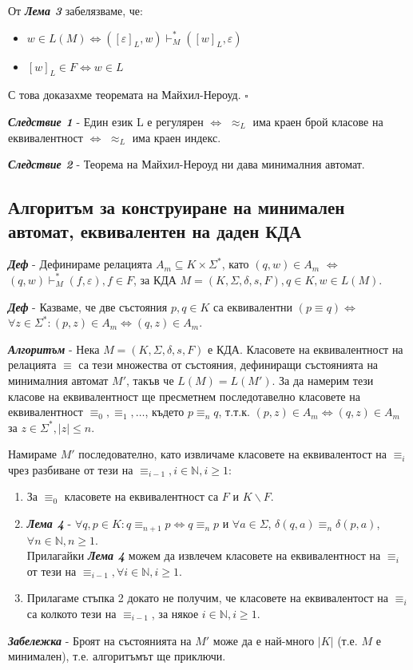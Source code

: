 \documentclass[fleqn,12pt]{article}
\begin{document}
\begin{flushleft}
От \textit{\textbf{Лема 3}} забелязваме, че:
\begin{itemize}
    \item $w \in L(M) \iff ([\varepsilon]_L, w) \vdash_M^* ([w]_L, \varepsilon)$
    \item $[w]_L \in F \iff w \in L$
\end{itemize}

С това доказахме теоремата на Майхил-Нероуд. $\square$

\textit{\textbf{Следствие 1}} - Един език L е регулярен $\iff$ $\approx_L$ има краен брой класове на еквивалентност $\iff$ $\approx_L$ има краен индекс.

\textit{\textbf{Следствие 2}} - Теорема на Майхил-Нероуд ни дава минималния автомат.

\subsection{Алгоритъм за конструиране на минимален автомат, еквивалентен на даден КДА}

\textit{\textbf{Деф}} - Дефинираме релацията $A_m \subseteq K \times \Sigma^*$, като $(q, w) \in A_m$ $\iff$ $(q, w) \vdash_M^* (f, \varepsilon), f \in F$, за КДА $M = (K, \Sigma, \delta, s, F), q \in K, w \in L(M)$.

\textit{\textbf{Деф}} - Казваме, че две състояния $p, q \in K$ са еквивалентни $(p \equiv q) \iff$ $\forall z \in \Sigma^*: (p, z) \in A_m \iff (q, z) \in A_m$.

\textit{\textbf{Алгоритъм}} - Нека $M = (K, \Sigma, \delta, s, F)$ е КДА. Класовете на еквивалентност на релацията $\equiv$ са тези множества от състояния, дефиниращи състоянията на минималния автомат $M'$, такъв че $L(M) = L(M')$. За да намерим тези класове на еквивалентност ще пресметнем последотавелно класовете на еквивалентност $\equiv_0, \equiv_1, \dots$, където $p \equiv_n q$, т.т.к. $(p, z) \in A_m \iff (q, z) \in A_m$ за $z \in \Sigma^*, |z| \leq n$.

Намираме $M'$ последователно, като извличаме класовете на еквивалентост на $\equiv_i$ чрез разбиване от тези на $\equiv_{i-1}, i \in \mathbb{N}, i \geq 1$:
\begin{enumerate}
    \item За $\equiv_0$ класовете на еквивалентност са $F$ и $K \backslash F$.
    \item \textit{\textbf{Лема 4}} -  $\forall q, p \in K: q \equiv_{n+1} p \iff q \equiv_n p$ и $\forall a \in \Sigma$, $\delta(q, a) \equiv_n \delta(p, a)$, $\forall n \in \mathbb{N}, n \geq 1$. \\
    Прилагайки \textit{\textbf{Лема 4}} можем да извлечем класовете на еквивалентност на $\equiv_i$ от тези на $\equiv_{i-1}, \forall i \in \mathbb{N}, i \geq 1$.
    \item Прилагаме стъпка 2 докато не получим, че класовете на еквивалентост на $\equiv_i$ са колкото тези на $\equiv_{i-1}$, за някое $i \in \mathbb{N}, i \geq 1$.
\end{enumerate}

\textit{\textbf{Забележка}} - Броят на състоянията на $M'$ може да е най-много $|K|$ (т.е. $M$ е минимален), т.е. алгоритъмът ще приключи.

\end{flushleft}
\end{document}
